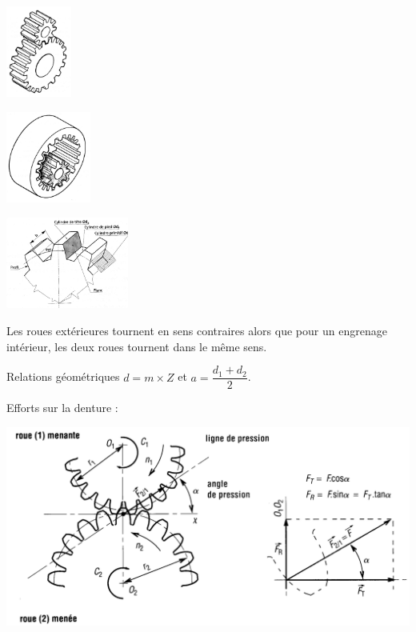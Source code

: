 \documentclass[11pt,oneside]{article}
\begin{document}
\begin{minipage}[c]{.3\linewidth}
\begin{center}
\includegraphics[height=3cm]{png/fig_63}
\end{center}
\end{minipage} \hfill
\begin{minipage}[c]{.3\linewidth}
\begin{center}
\includegraphics[height=3cm]{png/fig_64}
\end{center}
\end{minipage}\hfill
\begin{minipage}[c]{.3\linewidth}
\begin{center}
\includegraphics[height=3cm]{png/fig_65}
\end{center}
\end{minipage}

Les roues extérieures tournent en sens contraires alors que pour un engrenage intérieur, les deux roues tournent dans le même sens.

Relations géométriques $d=m\times Z $ et $a=\dfrac{d_1+d_2}{2}$.

Efforts sur la denture :

\begin{center}
\includegraphics[width=.7\textwidth]{png/fig_66}
\end{center}
\end{document}
